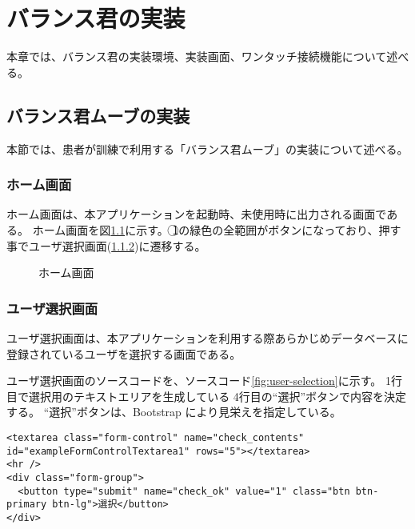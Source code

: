 \documentclass[uplatex,a4paper,12pt]{jsreport}
\begin{document}

\chapter{バランス君の実装}\label{chap:jisso}
本章では、バランス君の実装環境、実装画面、ワンタッチ接続機能について述べる。

\section{バランス君ムーブの実装}\label{sec:rihabiri_jisso}
本節では、患者が訓練で利用する「バランス君ムーブ」の実装について述べる。

\subsection{ホーム画面}\label{sec:home}
ホーム画面は、本アプリケーションを起動時、未使用時に出力される画面である。
ホーム画面を図\ref{fig:p_home}に示す。
\textcircled{\scriptsize 1}の緑色の全範囲がボタンになっており、押す事でユーザ選択画面(\ref{sec:all})に遷移する。
	
\begin{figure}[htbp]
  \centering %
  \fbox{
%
%
%
  }
  \caption{ホーム画面}\label{fig:p_home}
\end{figure}

\subsection{ユーザ選択画面}\label{sec:all}
ユーザ選択画面は、本アプリケーションを利用する際あらかじめデータベースに登録されているユーザを選択する画面である。

ユーザ選択画面のソースコードを、ソースコード\ref{fig:user-selection}に示す。
1行目で選択用のテキストエリアを生成している
4行目の``選択''ボタンで内容を決定する。
``選択''ボタンは、Bootstrap により見栄えを指定している。

\begin{lstlisting}[caption=ユーザ選択画面,label=fig:user-selection]
<textarea class="form-control" name="check_contents" id="exampleFormControlTextarea1" rows="5"></textarea>
<hr />
<div class="form-group">
  <button type="submit" name="check_ok" value="1" class="btn btn-primary btn-lg">選択</button>
</div>
\end{lstlisting}
\end{document}
